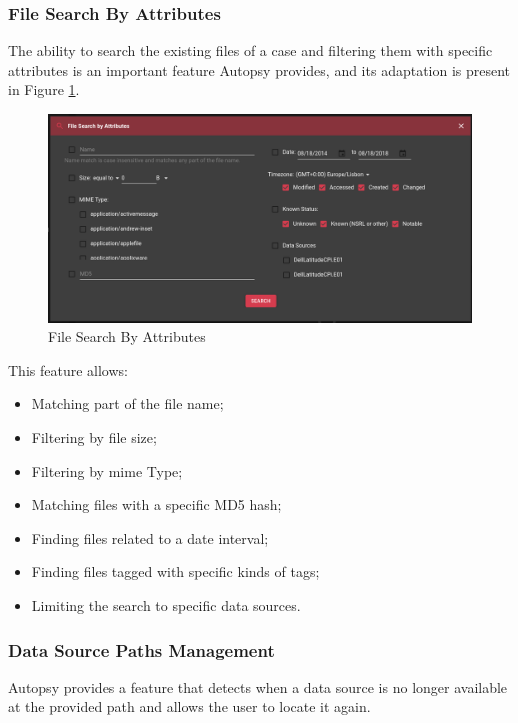 \subsubsection*{File Search By Attributes}

The ability to search the existing files of a case and filtering them with specific attributes is an important feature Autopsy provides, and its adaptation is present in Figure \ref{fig:search}.

\begin{figure}[ht]
 \centering
 \includegraphics[width=\linewidth]{imgs/search.png}
 \caption{File Search By Attributes}
 \label{fig:search}
\end{figure}

This feature allows:

\begin{itemize}
 \item Matching part of the file name;
 \item Filtering by file size;
 \item Filtering by \acrshort{mime} Type;
 \item Matching files with a specific MD5 hash;
 \item Finding files related to a date interval;
 \item Finding files tagged with specific kinds of tags;
 \item Limiting the search to specific data sources.
\end{itemize}

\subsubsection*{Data Source Paths Management}

Autopsy provides a feature that detects when a data source is no longer available at the provided path and allows the user to locate it again.

